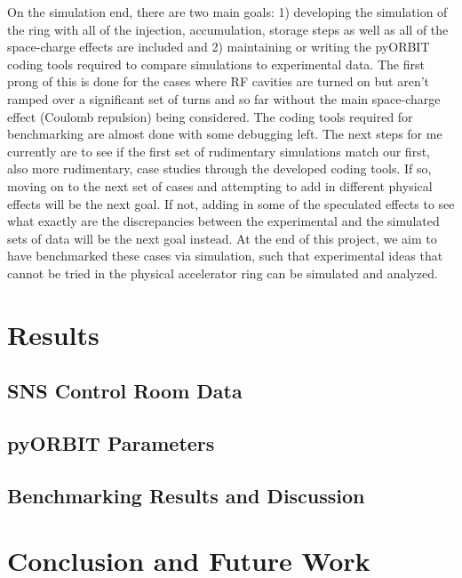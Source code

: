 \documentclass[12pt]{article}
\begin{document}
\par\noindent On the simulation end, there are two main goals: 1) developing the simulation of the ring with all of the injection, accumulation, storage steps as well as all of the space-charge effects are included and 2) maintaining or writing the pyORBIT coding tools required to compare simulations to experimental data. The first prong of this is done for the cases where RF cavities are turned on but aren’t ramped over a significant set of turns and so far without the main space-charge effect (Coulomb repulsion) being considered. The coding tools required for benchmarking are almost done with some debugging left. The next steps for me currently are to see if the first set of rudimentary simulations match our first, also more rudimentary, case studies through the developed coding tools. If so, moving on to the next set of cases and attempting to add in different physical effects will be the next goal. If not, adding in some of the speculated effects to see what exactly are the discrepancies between the experimental and the simulated sets of data will be the next goal instead. At the end of this project, we aim to have benchmarked these cases via simulation, such that experimental ideas that cannot be tried in the physical accelerator ring can be simulated and analyzed.
\section{Results}


\subsection{SNS Control Room Data}
\subsection{pyORBIT Parameters}
\subsection{Benchmarking Results and Discussion}
\section{Conclusion and Future Work}



\end{document}
